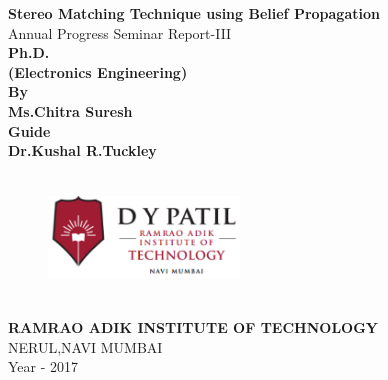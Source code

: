 \clearpage%

\begin{titlepage}
\clearpage
\thispagestyle{empty}

\begin{center}
\vspace{0.5in}
\vspace{0.5in}
{\Large \bf \textbf{Stereo Matching Technique using Belief Propagation} } \\
\vspace{0.5in}
\large {Annual Progress Seminar Report-III}\\
\vspace{0.5in}
\large \bf{Ph.D. }\\
\vspace{0.3in}
\large \bf (Electronics Engineering)\\
\vspace{0.5in}
\large \bf {By}\\
\vspace{0.2in}
{\large \bf Ms.Chitra Suresh}\\
\vspace{0.5in}
\large \bf {Guide}\\
\vspace{0.2in}
{\large \bf Dr.Kushal R.Tuckley}\\
\vspace{0.8in}
\vspace{0.5in}
\begin{figure}[h]
\centering
    \includegraphics[width=2.0in,height=1.3in]{./new_logo.eps}
    \end{figure}

\vspace{0.2in}
\textbf {RAMRAO ADIK INSTITUTE OF TECHNOLOGY}\\
\vspace{0.2in}
\large {NERUL,NAVI MUMBAI}\\
\vspace{0.2in}
\large {Year - 2017}

\end{center}
\end{titlepage}
